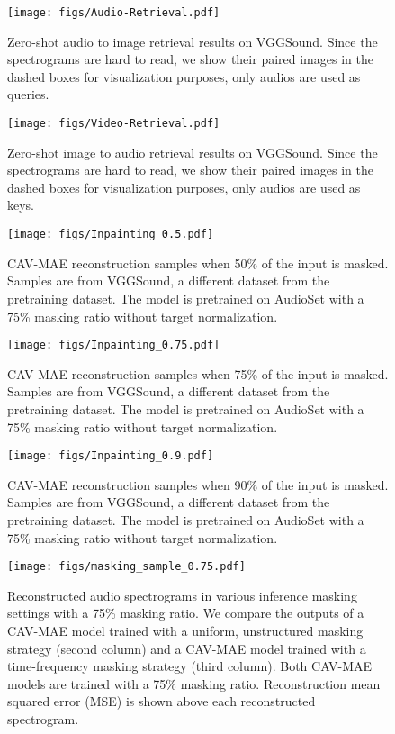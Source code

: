 \documentclass{article} \usepackage{iclr2023_conference,times}
\begin{document}
\begin{figure}[h]
\centering
\texttt{[image: figs/Audio-Retrieval.pdf]}
\caption{Zero-shot audio to image retrieval results on VGGSound. Since the spectrograms are hard to read, we show their paired images in the dashed boxes for visualization purposes, only audios are used as queries.}
\label{fig:addar}
\end{figure}

\begin{figure}[h]
\centering
\texttt{[image: figs/Video-Retrieval.pdf]}
\caption{Zero-shot image to audio retrieval results on VGGSound. Since the spectrograms are hard to read, we show their paired images in the dashed boxes for visualization purposes, only audios are used as keys.}
\label{fig:addvr}
\end{figure}


\begin{figure}[t]
\centering
\texttt{[image: figs/Inpainting\_0.5.pdf]}
\caption{CAV-MAE reconstruction samples when 50\% of the input is masked. Samples are from VGGSound, a different dataset from the pretraining dataset. The model is pretrained on AudioSet with a 75\% masking ratio without target normalization.}
\label{fig:in_0.5}
\end{figure}

\begin{figure}[t]
\centering
\texttt{[image: figs/Inpainting\_0.75.pdf]}
\caption{CAV-MAE reconstruction samples when 75\% of the input is masked. Samples are from VGGSound, a different dataset from the pretraining dataset. The model is pretrained on AudioSet with a 75\% masking ratio without target normalization.}
\label{fig:in_0.75}
\end{figure}

\begin{figure}[t]
\centering
\texttt{[image: figs/Inpainting\_0.9.pdf]}
\caption{CAV-MAE reconstruction samples when 90\% of the input is masked. Samples are from VGGSound, a different dataset from the pretraining dataset. The model is pretrained on AudioSet with a 75\% masking ratio without target normalization.}
\label{fig:in_0.9}
\end{figure}


\begin{figure}[t]
\centering
\texttt{[image: figs/masking\_sample\_0.75.pdf]}
\caption{Reconstructed audio spectrograms in various inference masking settings with a 75\% masking ratio. We compare the outputs of a CAV-MAE model trained with a uniform, unstructured masking strategy (second column) and a CAV-MAE model trained with a time-frequency masking strategy (third column). Both CAV-MAE models are trained with a 75\% masking ratio. Reconstruction mean squared error (MSE) is shown above each reconstructed spectrogram.}
\label{fig:mask_spec_0.75}
\end{figure}
\end{document}
